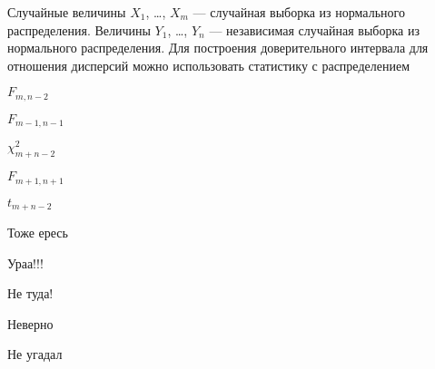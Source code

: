 
\begin{question}
Случайные величины \(X_1\), \ldots, \(X_m\) — случайная выборка из
нормального распределения. Величины \(Y_1\), \ldots, \(Y_n\) —
независимая случайная выборка из нормального распределения. Для
построения доверительного интервала для отношения дисперсий можно
использовать статистику с распределением
\begin{answerlist}
  \item \(F_{m,n-2}\)
  \item \(F_{m-1, n-1}\)
  \item \(\chi^2_{m+n-2}\)
  \item \(F_{m+1,n+1}\)
  \item \(t_{m+n-2}\)
\end{answerlist}
\end{question}

\begin{solution}
\begin{answerlist}
  \item Тоже ересь
  \item Ураа!!!
  \item Не туда!
  \item Неверно
  \item Не угадал
\end{answerlist}
\end{solution}

